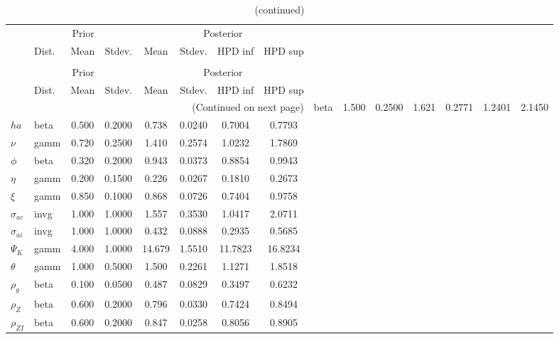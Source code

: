  
\begin{center}
\begin{longtable}{llcccccc} 
\caption{Results from Metropolis-Hastings (parameters)}
 \label{Table:MHPosterior:1}\\
\toprule 
  & \multicolumn{3}{c}{Prior}  &  \multicolumn{4}{c}{Posterior} \\
  \cmidrule(r{.75em}){2-4} \cmidrule(r{.75em}){5-8}
  & Dist. & Mean  & Stdev. & Mean & Stdev. & HPD inf & HPD sup\\
\midrule \endfirsthead 
\caption{(continued)}\\\toprule 
  & \multicolumn{3}{c}{Prior}  &  \multicolumn{4}{c}{Posterior} \\
  \cmidrule(r{.75em}){2-4} \cmidrule(r{.75em}){5-8}
  & Dist. & Mean  & Stdev. & Mean & Stdev. & HPD inf & HPD sup\\
\midrule \endhead 
\bottomrule \multicolumn{8}{r}{(Continued on next page)} \endfoot 
\bottomrule \endlastfoot 
${\sigma}$ & beta &   1.500 & 0.2500 &   1.621& 0.2771 &  1.2401 &  2.1450 \\ 
${ha}$ & beta &   0.500 & 0.2000 &   0.738& 0.0240 &  0.7004 &  0.7793 \\ 
$\nu$ & gamm &   0.720 & 0.2500 &   1.410& 0.2574 &  1.0232 &  1.7869 \\ 
${\phi}$ & beta &   0.320 & 0.2000 &   0.943& 0.0373 &  0.8854 &  0.9943 \\ 
${\eta}$ & gamm &   0.200 & 0.1500 &   0.226& 0.0267 &  0.1810 &  0.2673 \\ 
$\xi$ & gamm &   0.850 & 0.1000 &   0.868& 0.0726 &  0.7404 &  0.9758 \\ 
${\sigma_{ac}}$ & invg &   1.000 & 1.0000 &   1.557& 0.3530 &  1.0417 &  2.0711 \\ 
${\sigma_{ai}}$ & invg &   1.000 & 1.0000 &   0.432& 0.0888 &  0.2935 &  0.5685 \\ 
${\Psi_{K}}$ & gamm &   4.000 & 1.0000 &  14.679& 1.5510 & 11.7823 & 16.8234 \\ 
${\theta}$ & gamm &   1.000 & 0.5000 &   1.500& 0.2261 &  1.1271 &  1.8518 \\ 
${\rho_g}$ & beta &   0.100 & 0.0500 &   0.487& 0.0829 &  0.3497 &  0.6232 \\ 
${\rho_Z}$ & beta &   0.600 & 0.2000 &   0.796& 0.0330 &  0.7424 &  0.8494 \\ 
${\rho_{ZI}}$ & beta &   0.600 & 0.2000 &   0.847& 0.0258 &  0.8056 &  0.8905 \\ 

\end{longtable}
\end{center}
